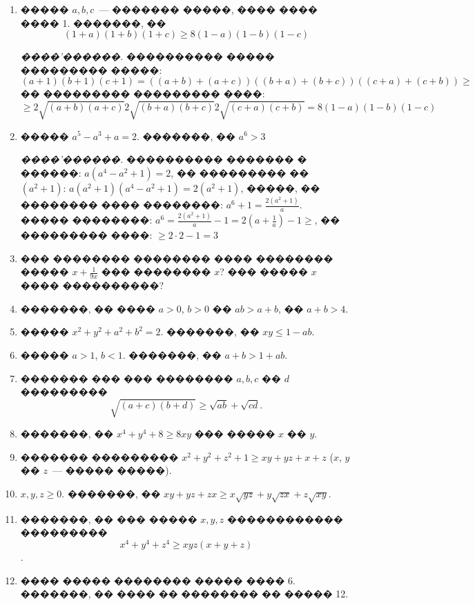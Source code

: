 \documentclass[a4paper,12pt]{article}
\begin{document}
\begin{enumerate}
\item ����� $a,b,c$~--- ������� �����, ���� ���� ���� 1. �������, �� $$(1+a)(1+b)(1+c)\geq 8(1-a)(1-b)(1-c)$$

\textit{����'������.} ���������� ����� ��������� �����: $$(a+1)(b+1)(c+1)=((a+b)+(a+c))((b+a)+(b+c))((c+a)+(c+b)) \geq $$ �� ��������� ��������� ����: $$\geq 2\sqrt{(a+b)(a+c)}2\sqrt{(b+a)(b+c)}2\sqrt{(c+a)(c+b)}=8(1-a)(1-b)(1-c)$$

\item ����� $a^{5}-a^{3}+a=2$. �������, �� $a^{6}>3$

\textit{����'������.} ���������� ������� � ������: $a(a^{4}-a^{2}+1) = 2$, �� ��������� �� $(a^{2}+1)$: $a(a^{2}+1)(a^{4}-a^{2}+1) = 2(a^{2}+1)$, �����, �� �������� ���� ��������: $a^{6}+1= \frac{2(a^{2}+1)}{a}$. ����� ��������: $a^{6}=\frac{2(a^{2}+1)}{a} - 1 = 2(a+\frac{1}{a})-1\geq$, �� ��������� ����: $\geq 2\cdot 2 - 1= 3$

\item ��� �������� �������� ���� �������� ����� $x+\frac{1}{9x}$ ��� �������� $x$? ��� ����� $x$ ���� ����������?

\item �������, �� ���� $a>0$, $b>0$ �� $ab>a+b$, �� $a+b>4$.

\item ����� $x^{2}+y^{2}+a^{2}+b^{2}=2$. �������, �� $xy\leq 1-ab$.

\item ����� $a>1$, $b<1$. �������, �� $a+b>1+ab$.

\item ������� ��� ��� �������� $a,b,c$ �� $d$ ��������� $$\sqrt{(a+c)(b+d)}\geq \sqrt{ab}+\sqrt{cd}.$$

\item �������, �� $x^{4}+y^{4}+8\geq 8xy$ ��� ����� $x$ �� $y$.

\item ������� ��������� $x^{2}+y^{2}+z^{2}+1\geq xy+yz+x+z$ ($x$, $y$ �� $z$~--- ����� �����).

\item $x,y,z\geq 0$. �������, �� $xy+yz+zx\geq x\sqrt{yz}+y\sqrt{zx}+z\sqrt{xy}$.

\item �������, �� ��� ����� $x,y,z$ ������������ ��������� $$x^{4}+y^{4}+z^{4}\geq xyz(x+y+z)$$.

\item ���� ����� �������� ����� ���� 6. �������, �� ���� �� �������� �� ����� 12.


\end{enumerate}
\end{document}
